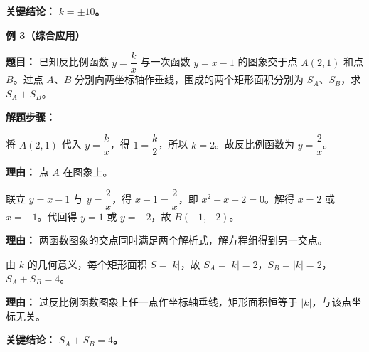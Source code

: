 \begin{examplebox}
	\textbf{\textcolor{CExample}{关键结论：}} \textbf{$k=\pm 10$。}

	\medskip
	\textbf{\textcolor{CExample}{例 3（综合应用）}}

	\textbf{\textcolor{CExample}{题目：}} 已知反比例函数 $y=\dfrac{k}{x}$ 与一次函数 $y=x-1$ 的图象交于点 $A(2,1)$ 和点 $B$。过点 $A$、$B$ 分别向两坐标轴作垂线，围成的两个矩形面积分别为 $S_A$、$S_B$，求 $S_A+S_B$。

	\textbf{\textcolor{CExample}{解题步骤：}}
	\begin{description}[style=nextline, leftmargin=2.8em, labelsep=0.5em, itemsep=0.45em]
		\item[\textbf{第一步（求 $k$）：}]
		      将 $A(2,1)$ 代入 $y=\dfrac{k}{x}$，得 $1=\dfrac{k}{2}$，所以 $k=2$。故反比例函数为 $y=\dfrac{2}{x}$。
		      \par\textbf{理由：} 点 $A$ 在图象上。
		\item[\textbf{第二步（求 $B$ 坐标）：}]
		      联立 $y=x-1$ 与 $y=\dfrac{2}{x}$，得 $x-1=\dfrac{2}{x}$，即 $x^2-x-2=0$。解得 $x=2$ 或 $x=-1$。代回得 $y=1$ 或 $y=-2$，故 $B(-1,-2)$。
		      \par\textbf{理由：} 两函数图象的交点同时满足两个解析式，解方程组得到另一交点。
		\item[\textbf{第三步（面积和）：}]
		      由 $k$ 的几何意义，每个矩形面积 $S=|k|$，故 $S_A=|k|=2$，$S_B=|k|=2$，$S_A+S_B=4$。
		      \par\textbf{理由：} 过反比例函数图象上任一点作坐标轴垂线，矩形面积恒等于 $|k|$，与该点坐标无关。
	\end{description}

	\textbf{\textcolor{CExample}{关键结论：}} \textbf{$S_A+S_B=4$。}
\end{examplebox}